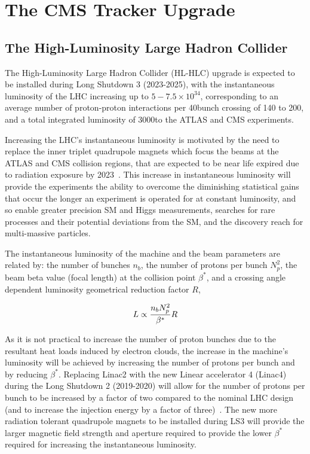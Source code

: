 \chapter{The CMS Tracker Upgrade}\label{chapter:tk-upgrade}
 
\section{The High-Luminosity Large Hadron Collider} \label{sec:hl-lhc}
The High-Luminosity Large Hadron Collider (HL-HLC) upgrade is expected to be installed during Long Shutdown 3 (2023-2025), with the instantaneous luminosity of the LHC increasing up to $5-7.5 \times {10}^{34}$\percms, corresponding to an average number of proton-proton interactions per 40\MHz bunch crossing of 140 to 200, and a total integrated luminosity of 3000\fbinv to the ATLAS and CMS experiments.

Increasing the LHC's instantaneous luminosity is motivated by the need to replace the inner triplet quadrupole magnets which focus the beams at the ATLAS and CMS collision regions, that are expected to be near life expired due to radiation exposure by 2023~\cite{hl-lhc-prelim-design-report,CMSCollaboration:2015zni}.
This increase in instantaneous luminosity will provide the experiments the ability to overcome the diminishing statistical gains that occur the longer an experiment is operated for at constant luminosity, and so enable greater precision SM and Higgs measurements, searches for rare processes and their potential deviations from the SM, and the discovery reach for multi-\TeV massive particles.

The instantaneous luminosity of the machine and the beam parameters are related by: the number of bunches $n_{b}$, the number of protons per bunch $N^{2}_{p}$, the beam beta value (focal length) at the collision point $\beta^{*}$, and a crossing angle dependent luminosity geometrical reduction factor $R$,

\begin{equation}
L \propto \frac{n_{b}N^{2}_{p}}{\beta^{*}} R \\
\label{eq:machineLumi}
\end{equation}

As it is not practical to increase the number of proton bunches due to the resultant heat loads induced by electron clouds, the increase in the machine's luminosity will be achieved by increasing the number of protons per bunch and by  reducing $\beta^{*}$.
Replacing Linac2 with the new Linear accelerator 4 (Linac4) during the Long Shutdown 2 (2019-2020) will allow for the number of protons per bunch to be increased by a factor of two compared to the nominal LHC design (and to increase the injection energy by a factor of three)~\cite{linac4}.
The new more radiation tolerant quadrupole magnets to be installed during LS3 will provide the larger magnetic field strength and aperture required to provide the lower $\beta^{*}$ required for increasing the instantaneous luminosity. 

